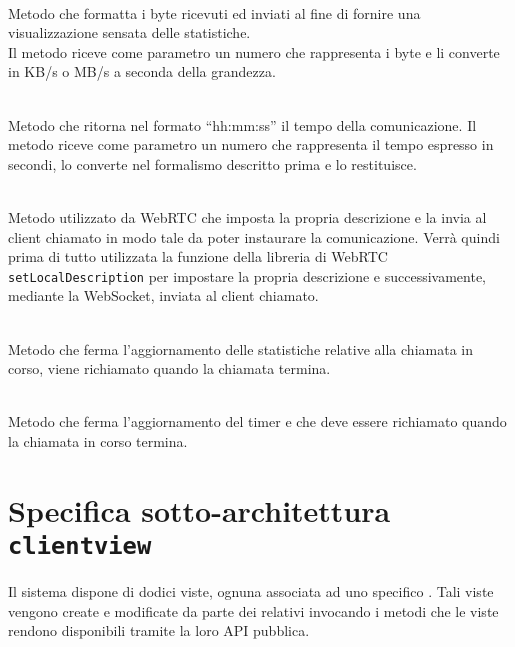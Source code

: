 \begin{description}
  \item{}\\
  Metodo che formatta i byte ricevuti ed inviati al fine di fornire una visualizzazione sensata delle statistiche.\\
Il metodo riceve come parametro un numero che rappresenta i byte e li converte in KB/s o MB/s a seconda della grandezza.

  \item{}\\
  Metodo che ritorna nel formato ``hh:mm:ss'' il tempo della comunicazione. Il metodo riceve come parametro un numero che rappresenta il tempo espresso in secondi, lo converte nel formalismo descritto prima e lo restituisce.

  \item{}\\
  Metodo utilizzato da WebRTC che imposta la propria descrizione e la invia al client chiamato in modo tale da poter instaurare la comunicazione. Verrà quindi prima di tutto utilizzata la funzione della libreria di WebRTC \verb'setLocalDescription' per impostare la propria descrizione e successivamente, mediante la WebSocket, inviata al client  chiamato.

  \item{}\\
  Metodo che ferma l'aggiornamento delle statistiche relative alla chiamata in corso, viene richiamato quando la chiamata termina.

  \item{}\\
  Metodo che ferma l'aggiornamento del timer e che deve essere richiamato quando la chiamata in corso termina.

\end{description}

\clearpage

\section{Specifica sotto-architettura \texttt{clientview}}\label{sec:clientviewarchitecture}
Il sistema dispone di dodici viste, ognuna associata ad uno specifico . Tali viste vengono create e modificate da parte dei relativi  invocando i metodi che le viste rendono disponibili tramite la loro API pubblica.

